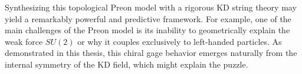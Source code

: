 Synthesizing this topological Preon model with a rigorous KD string theory may yield a remarkably powerful and predictive framework. For example, one of the main challenges of the Preon model is its inability to geometrically explain the weak force $SU(2)$ or why it couples exclusively to left-handed particles. As demonstrated in this thesis, this chiral gage behavior emerges naturally from the internal symmetry of the KD field, which might explain the puzzle.







\printbibliography[heading=subbibintoc, title={References for Chapter \thechapter}]